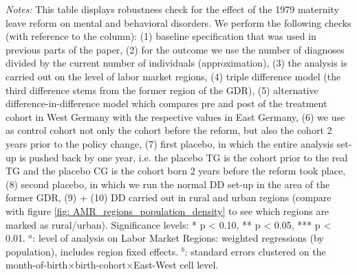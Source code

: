 \begin{landscape}
\begin{table}[htbp]
\begin{threeparttable}
{\begin{tabular}{l*{10}{c}}
					\bottomrule
			\end{tabular}}
	\end{threeparttable} 
		\begin{minipage}{0.87\linewidth}
		\scriptsize \emph{Notes:} This table displays robustness check for the effect of the 1979 maternity leave reform on mental and behavioral disorders. We perform the following checks (with reference to the column): (1) baseline specification that was used in previous parts of the paper, (2) for the outcome we use the number of diagnoses divided by the current number of individuals (approximation), (3) the analysis is carried out on the level of labor market regions, (4) triple difference model (the third difference stems from the former region of the GDR), (5) alternative difference-in-difference model which compares pre and post of the treatment cohort in West Germany with the respective values in East Germany, (6) we use as control cohort not only the cohort before the reform, but also the cohort 2 years prior to the policy change, (7) first placebo, in which the entire analysis set-up is pushed back by one year, i.e. the placebo TG is the cohort prior to the real TG and the placebo CG is the cohort born 2 years before the reform took place, (8) second placebo, in which we run the normal DD set-up in the area of the former GDR, (9) + (10)  DD carried out in rural and urban regions (compare with figure \ref{fig: AMR_regions_population_density} to see which regions are marked as rural/urban). \newline Significance levels: * p < 0.10, ** p < 0.05, *** p < 0.01. \newline
		\hspace*{15 pt}$^a$: level of analysis on Labor Market Regions: weighted regressions (by population), includes region fixed effects.\newline
		\hspace*{15 pt}$^b$: standard errors clustered on the month-of-birth$\times$birth-cohort$\times$East-West cell level.
	\end{minipage}
\end{table} 
	\vspace*{\fill}\clearpage
\end{landscape}



